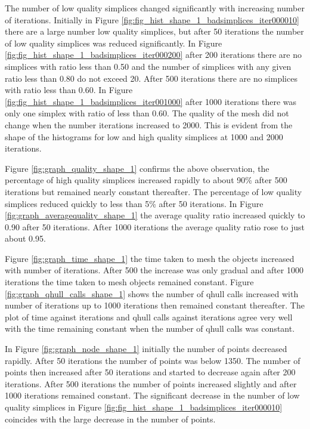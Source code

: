 \documentclass[10pt,a4paper]{book}
\begin{document}
The number of low quality simplices changed significantly with increasing number of iterations. Initially in Figure \ref{fig:fig_hist_shape_1_badsimplices_iter000010} there are a large number low quality simplices, but after 50 iterations the number of low quality simplices was reduced significantly. In Figure \ref{fig:fig_hist_shape_1_badsimplices_iter000200} after 200 iterations there are no simplices with ratio less than 0.50 and the number of simplices with any given ratio less than 0.80 do not exceed 20. After 500 iterations there are no simplices with ratio less than 0.60. In Figure \ref{fig:fig_hist_shape_1_badsimplices_iter001000} after 1000 iterations there was only one simplex with ratio of less than 0.60. The quality of the mesh did not change when the number iterations increased to 2000. This is evident from the shape of the histograms for low and high quality simplices at 1000 and 2000 iterations.

Figure \ref{fig:graph_quality_shape_1} confirms the above observation, the percentage of high quality simplices increased rapidly to about 90\% after 500 iterations but remained nearly constant thereafter. The percentage of low quality simplices reduced quickly to less than 5\% after 50 iterations. In Figure \ref{fig:graph_averagequality_shape_1} the average quality ratio increased quickly to 0.90 after 50 iterations. After 1000 iterations the average quality ratio rose to just about 0.95.

Figure \ref{fig:graph_time_shape_1} the time taken to mesh the objects increased with number of iterations. After 500 the increase was only gradual and after 1000 iterations the time taken to mesh objects remained constant. Figure \ref{fig:graph_qhull_calls_shape_1} shows the number of qhull calls increased with number of iterations up to 1000 iterations then remained constant thereafter. The plot of time against iterations and qhull calls against iterations agree very well with the time remaining constant when the number of qhull calls was constant.

In Figure \ref{fig:graph_node_shape_1} initially the number of points decreased rapidly. After 50 iterations the number of points was below 1350. The number of points then increased after 50 iterations and started to decrease again after 200 iterations. After 500 iterations the number of points increased slightly and after 1000 iterations remained constant. The significant decrease in the number of low quality simplices in Figure \ref{fig:fig_hist_shape_1_badsimplices_iter000010} coincides with the large decrease in the number of points.
\end{document}
